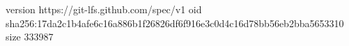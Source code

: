 version https://git-lfs.github.com/spec/v1
oid sha256:17da2c1b4afe6c16a886b1f26826df6f916e3c0d4c16d78bb56eb2bba5653310
size 333987
